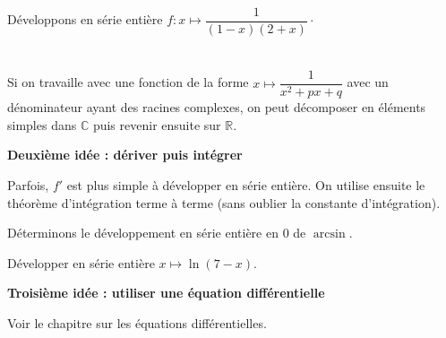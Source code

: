 \documentclass[a4paper,10pt]{report}
\begin{document}
\begin{ex} Développons en série entière $f : x \mapsto \dfrac{1}{(1-x)(2+x)}\cdot$

\vspace{8cm}
\end{ex}
\medskip



$\phantom{test}$
\vspace{5cm}
\begin{rem} Si on travaille avec une fonction de la forme $x \mapsto \dfrac{1}{x^2+px+q}$ avec un dénominateur ayant des racines complexes, on peut décomposer en éléments simples dans $\mathbb{C}$ puis revenir ensuite sur $\mathbb{R}$.
\end{rem}

\medskip


\noindent \textbf{Deuxième idée : dériver puis intégrer}

\noindent Parfois, $f'$ est plus simple à développer en série entière. On utilise ensuite le théorème d'intégration terme à terme (sans oublier la constante d'intégration).

\medskip
\newpage
\begin{ex} Déterminons le développement en série entière en $0$ de $\arcsin$.

\vspace{17.5cm}
\end{ex}

\begin{exa} Développer en série entière $x \mapsto \ln(7-x)$.
\end{exa}

\medskip

\noindent \textbf{Troisième idée : utiliser une équation différentielle}

\noindent Voir le chapitre sur les équations différentielles.
\end{document}

